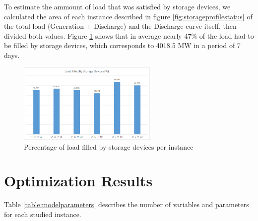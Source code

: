 \documentclass[12pt,LUDisStyle,twosided]{book}
\begin{document}
To estimate the ammount of load that was satisfied by storage devices, we calculated the area of each instance described in figure \ref{fig:storageprofilestatus} of the total load (Generation + Discharge) and the Discharge curve itself, then divided both values. Figure \ref{fig:loadfilled} shows that in average nearly 47\% of the load had to be filled by storage devices, which corresponds to 4018.5 MW in a period of 7 days.

\begin{figure}[H] 
	\begin{center}
		\includegraphics[width=0.6\textwidth,keepaspectratio]{loadfilledstorage.png}
	  	\caption{Percentage of load filled by storage devices per instance}
     	\label{fig:loadfilled}
	\end{center}
\end{figure}

\section{Optimization Results} \label{section:optimizationresults}

Table \ref{table:modelparameters} describes the number of variables and parameters for each studied instance. 
\end{document}
